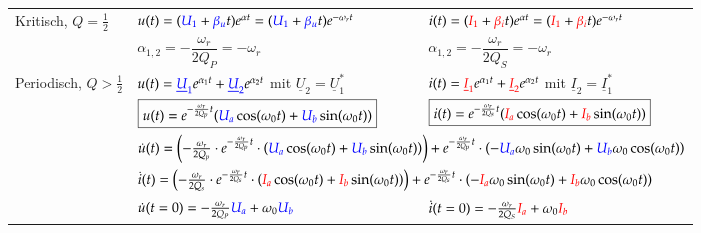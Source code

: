 \begin{tabular}{| p{3.5cm} | p{7.5cm} | p{7cm} |}
	Kritisch, $ Q = \frac{1}{2}$
		& $u(t) = (\textcolor{blue}{U_1} + \textcolor{blue}{\beta_u} t) 
		e^{\alpha t} = (\textcolor{blue}{U_1} + \textcolor{blue}{\beta_u} t) 
		e^{- \omega_r t}$ 
		& $i(t) = (\textcolor{red}{I_1} + \textcolor{red}{\beta_i} t) 
		e^{\alpha t} = (\textcolor{red}{I_1} + \textcolor{red}{\beta_i} t) 
		e^{- \omega_r t}$ \\
	\centering{$\alpha_1 = \alpha_2$}
		& $\alpha_{1,2} = - \dfrac{\omega_r}{2 Q_P} = - \omega_r$ & 
		$\alpha_{1,2} = - \dfrac{\omega_r}{2 Q_S} = - \omega_r$
		\vspace{0.1cm}\\
		\hline 
	
		
	Periodisch, $ Q > \frac{1}{2}$
		& $u(t) = \textcolor{blue}{\underline{U}_1} e^{\alpha_1 t} + 
					\textcolor{blue}{\underline{U}_2} e^{\alpha_2 t} $ mit $\underline{U}_2 = {\underline{U}_1^\ast}$
		& $i(t) = \textcolor{red}{\underline{I}_1} e^{\alpha_1 t} + 
					\textcolor{red}{\underline{I}_2} e^{\alpha_2 t} $ mit $\underline{I}_2 = {\underline{I}_1^\ast}$\\
	\centering{$\alpha_1, \alpha_2$ imaginär} 
	  & $\boxed{u(t) = e^{-\frac{\omega_r}{2Q_p}t}(\textcolor{blue}{U_a}\cos(\omega_0 t)+\textcolor{blue}{U_b}\sin(\omega_0
	  t))}$
	  & $\boxed{i(t) = e^{-\frac{\omega_r}{2Q_s}t}(\textcolor{red}{I_a}\cos(\omega_0 t)+\textcolor{red}{I_b}\sin(\omega_0
	  t))}$\\ \cline{2-3}
	  &
	  \multicolumn{2}{l|}{
	  $\dot{u}(t)=\left(-\frac{\omega_r}{2Q_p} \cdot e^{-\frac{\omega_r}{2Q_p}t} \cdot \left(\textcolor{blue}{U_a}\cos(\omega_0
	  t)+\textcolor{blue}{U_b}\sin(\omega_0
	  t)\right)\right)+e^{-\frac{\omega_r}{2Q_p}t}\cdot \left(-\textcolor{blue}{U_a}\omega_0\sin(\omega_0
	  t) + \textcolor{blue}{U_b}\omega_0\cos(\omega_0 t)\right)$ }\\
	  &
	  \multicolumn{2}{l|}{
	  $\dot{i}(t)=\left(-\frac{\omega_r}{2Q_s} \cdot e^{-\frac{\omega_r}{2Q_s}t} \cdot \left(\textcolor{red}{I_a}\cos(\omega_0
	  t)+\textcolor{red}{I_b}\sin(\omega_0
	  t)\right)\right)+e^{-\frac{\omega_r}{2Q_s}t} \cdot \left(-\textcolor{red}{I_a}\omega_0\sin(\omega_0
	  t) + \textcolor{red}{I_b}\omega_0\cos(\omega_0 t)\right)$ }\\ 	  \cline{2-3}
	  & $\dot{u}(t=0)=-\frac{\omega_r}{2Q_P}\textcolor{blue}{U_a}+\omega_0\textcolor{blue}{U_b} $ &
	  $\dot{i}(t=0)=-\frac{\omega_r}{2Q_S}\textcolor{red}{I_a}+\omega_0 \textcolor{red}{I_b}$ \\

\end{tabular}
